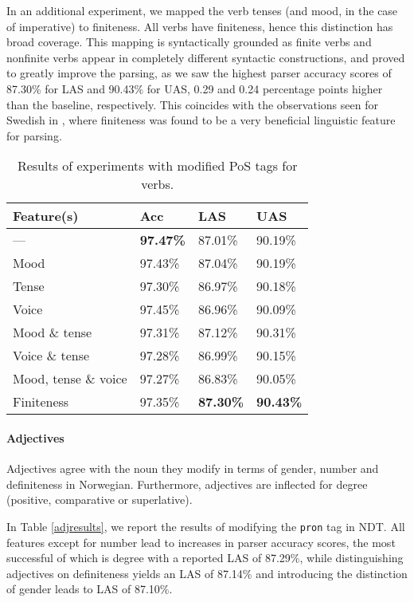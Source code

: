 \documentclass[11pt,a4paper]{article}
\begin{document}
In an additional experiment, we mapped the verb tenses (and mood, in the case
of imperative) to finiteness. All verbs have finiteness, hence this distinction
has broad coverage. This mapping is syntactically grounded as finite verbs and
nonfinite verbs appear in completely different syntactic constructions, and
proved to greatly improve the parsing, as we saw the highest parser accuracy
scores of 87.30\% for LAS and 90.43\% for UAS, 0.29 and 0.24 percentage points
higher than the baseline, respectively. This coincides with the observations
seen for Swedish in , where finiteness was found
to be a very beneficial linguistic feature for parsing.

\begin{table}
    \centering
    \smaller[0.5]
    \begin{tabular}{@{}llll@{}}
        \toprule
        \textbf{Feature(s)} & \textbf{Acc} & \textbf{LAS} & \textbf{UAS} \\
        \midrule
        --- & \textbf{97.47\%} & 87.01\% & 90.19\% \\
        Mood & 97.43\% & 87.04\% & 90.19\% \\
        Tense & 97.30\% & 86.97\% & 90.18\% \\
        Voice & 97.45\% & 86.96\% & 90.09\% \\
        Mood \& tense & 97.31\% & 87.12\% & 90.31\% \\
        Voice \& tense & 97.28\% & 86.99\% & 90.15\% \\
        Mood, tense \& voice & 97.27\% & 86.83\% & 90.05\% \\
        Finiteness & 97.35\% & \textbf{87.30\%} & \textbf{90.43\%} \\
        \bottomrule
    \end{tabular}
    \caption{Results of experiments with modified PoS tags for verbs.}
    \label{verbresults}
\end{table}

\paragraph{Adjectives}
Adjectives agree with the noun they modify in terms of gender, number and
definiteness in Norwegian. Furthermore, adjectives are inflected for
degree (positive, comparative or superlative).

In Table \ref{adjresults}, we report the results of modifying the \texttt{pron}
tag in NDT. All features except for number lead to increases in parser accuracy
scores, the most successful of which is degree with a reported LAS of 87.29\%,
while distinguishing adjectives on definiteness yields an LAS of 87.14\% and
introducing the distinction of gender leads to LAS of 87.10\%.
\end{document}
